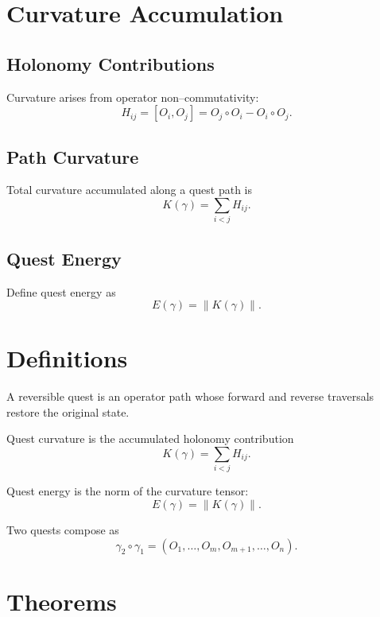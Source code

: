 \section{Curvature Accumulation}

\subsection{Holonomy Contributions}
Curvature arises from operator non–commutativity:
\[
H_{ij} = [O_i, O_j]
       = O_j \circ O_i - O_i \circ O_j.
\]

\subsection{Path Curvature}
Total curvature accumulated along a quest path is
\[
K(\gamma) = \sum_{i < j} H_{ij}.
\]

\subsection{Quest Energy}
Define quest energy as
\[
E(\gamma) = \|K(\gamma)\|.
\]

\section{Definitions}

\begin{definition}
A reversible quest is an operator path whose forward and reverse
traversals restore the original state.
\end{definition}

\begin{definition}
Quest curvature is the accumulated holonomy contribution
\[
K(\gamma) = \sum_{i < j} H_{ij}.
\]
\end{definition}

\begin{definition}
Quest energy is the norm of the curvature tensor:
\[
E(\gamma) = \|K(\gamma)\|.
\]
\end{definition}

\begin{definition}
Two quests compose as
\[
\gamma_2 \circ \gamma_1
    = (O_1, \ldots, O_m, O_{m+1}, \ldots, O_n).
\]
\end{definition}

\section{Theorems}

